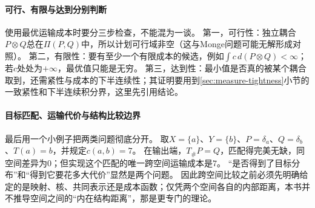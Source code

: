 \paragraph{可行、有限与达到分别判断}

使用最优运输成本时要分三步检查，不能混为一谈。
第一，可行性：独立耦合$P\otimes Q$总在$\Pi(P,Q)$中，所以计划可行域非空（这与Monge问题可能无解形成对照）。
第二，有限性：要有至少一个有限成本的候选，例如$\int c\,d(P\otimes Q)<\infty$；若$c$处处为$+\infty$，最优值只能是无穷。
第三，达到性：最小值是否真的被某个耦合取到，还需紧性与成本的下半连续性；其证明要用到\ref{sec:measure-tightness}小节的一致紧性和下半连续积分界，这里先引用结论。

\paragraph{目标匹配、运输代价与结构比较边界}

最后用一个小例子把两类问题彻底分开。
取$X=\{a\}$、$Y=\{b\}$、$P=\delta_a$、$Q=\delta_b$、$T(a)=b$，并规定$c(a,b)=7$。
在输出端，$T_\#P=Q$，匹配得完美无缺，同空间差异为$0$；但实现这个匹配的唯一跨空间运输成本是$7$。
“是否得到了目标分布”和“得到它要花多大代价”显然是两个问题。
因此跨空间比较之前必须先明确给定的是映射、核、共同表示还是成本函数；仅凭两个空间各自的内部距离，本书并不推导空间之间的“内在结构距离”，那是更专门的理论。
